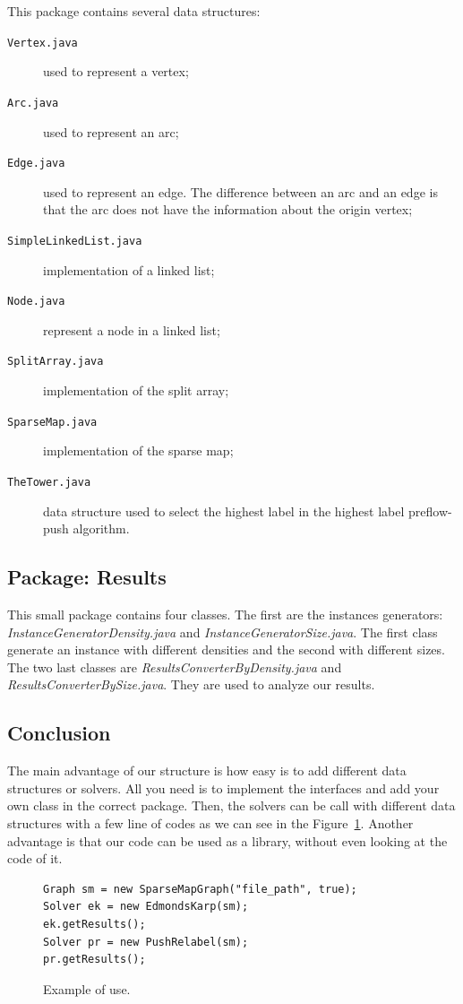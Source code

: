 This package contains several data structures: 
\begin{description}
	\item[\texttt{Vertex.java}] used to represent a vertex;
	\item[\texttt{Arc.java}] used to represent an arc;
	\item[\texttt{Edge.java}] used to represent an edge. The difference between an arc and an edge is that the arc does not have the information about the origin vertex;
	\item[\texttt{SimpleLinkedList.java}] implementation of a linked list;
	\item[\texttt{Node.java}] represent a node in a linked list;
	\item[\texttt{SplitArray.java}] implementation of the split array;
	\item[\texttt{SparseMap.java}] implementation of the sparse map;
	\item[\texttt{TheTower.java}] data structure used to select the highest label in the highest label preflow-push algorithm.
\end{description}

\subsection{Package: Results}

This small package contains four classes. The first are the instances generators: \textit{InstanceGeneratorDensity.java} and \textit{InstanceGeneratorSize.java}. The first class generate an instance with different densities and the second with different sizes. The two last classes are \textit{ResultsConverterByDensity.java} and \textit{ResultsConverterBySize.java}. They are used to analyze our results.

\subsection{Conclusion}


The main advantage of our structure is how easy is to add different data structures or solvers. All you need is to implement the interfaces and add your own class in the correct package. Then, the solvers can be call with different data structures with a few line of codes as we can see in the Figure~\ref{simple_code}. Another advantage is that our code can be used as a library, without even looking at the code of it.

\begin{figure}
\begin{lstlisting}
Graph sm = new SparseMapGraph("file_path", true);
Solver ek = new EdmondsKarp(sm);
ek.getResults();
Solver pr = new PushRelabel(sm);
pr.getResults();
\end{lstlisting}
\caption{Example of use.}
\label{simple_code}
\end{figure}


